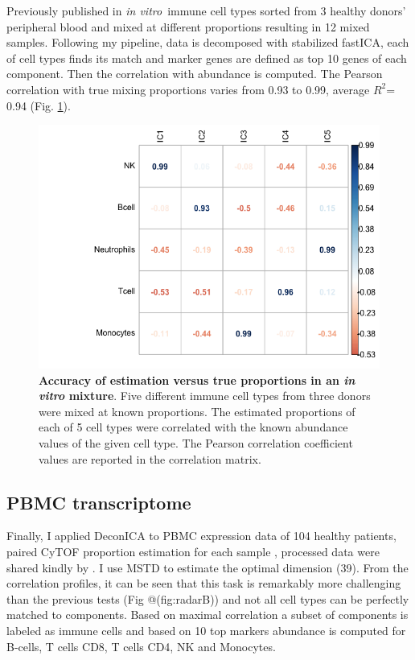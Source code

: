 \documentclass[12pt,]{book}
\theoremstyle{definition}
\theoremstyle{definition}
\theoremstyle{definition}
\theoremstyle{remark}
\begin{document}
Previously published in \citep{Becht2016} \emph{in vitro}~immune cell
types sorted from 3 healthy donors' peripheral blood and mixed at
different proportions resulting in 12 mixed samples. Following my
pipeline, data is decomposed with stabilized fastICA, each of cell types
finds its match and marker genes are defined as top 10 genes of each
component. Then the correlation with abundance is computed. The Pearson
correlation with true mixing proportions varies from 0.93 to 0.99,
average \(R^2\)= 0.94 (Fig. \ref{fig:invitro}).

\begin{figure}

{\centering \includegraphics[width=0.7\linewidth]{figures-ext/invitro} 

}

\caption[Accuracy of estimation versus true proporitons in an in vitro mixture]{\textbf{Accuracy of estimation versus true
proportions in an \emph{in vitro} mixture}. Five different immune cell
types from three donors were mixed at known proportions. The estimated
proportions of each of 5 cell types were correlated with the known
abundance values of the given cell type. The Pearson correlation
coefficient values are reported in the correlation matrix.}\label{fig:invitro}
\end{figure}








\hypertarget{pbmc-transcriptome}{%
\subsection{PBMC transcriptome}\label{pbmc-transcriptome}}

Finally, I applied DeconICA to PBMC expression data of 104 healthy
patients, paired CyTOF proportion estimation for each sample
\citep{Whiting2015}, processed data were shared kindly by
\citep{Aran2017}. I use MSTD to estimate the optimal dimension (39).
From the correlation profiles, it can be seen that this task is
remarkably more challenging than the previous tests (Fig @(fig:radarB))
and not all cell types can be perfectly matched to components. Based on
maximal correlation a subset of components is labeled as immune cells
and based on 10 top markers abundance is computed for B-cells, T cells
CD8, T cells CD4, NK and Monocytes.
\end{document}
